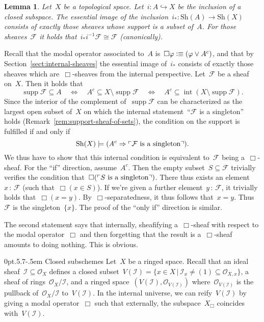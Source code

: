 \documentclass[10pt,reqno,a4paper]{amsbook}
\makeatletter
\theoremstyle{definition}
\theoremstyle{plain}
\newtheorem{lemma}[defn]{Lemma}
\theoremstyle{remark}
\newcommand{\F}{\mathcal{F}}
\renewcommand{\O}{\mathcal{O}}
\newcommand{\I}{\mathcal{I}}
\newcommand{\Sh}{\mathrm{Sh}}
\DeclareMathOperator{\Int}{int}
\DeclareMathOperator{\supp}{supp}
\newcommand{\?}{\,{:}\,}
\renewcommand{\_}{\mathpunct{.}\,}
\newcommand{\speak}[1]{\ulcorner\text{\textnormal{#1}}\urcorner}
\newcommand{\defequiv}{\vcentcolon\equiv}
\renewenvironment{proof}[1][\proofname]{\par
  \pushQED{\qed}%
  \normalfont \topsep6\p@\@plus6\p@\relax
  \trivlist
  \item[\hskip\labelsep
        \itshape
    #1\@addpunct{.}]\ignorespaces
}{%
  \popQED\endtrivlist\@endpefalse
}
\def\subsection{\@startsection{subsection}{2}%
  {0pt}{.5\linespacing\@plus.7\linespacing}{-.5em}%
  {\normalfont\bfseries}}
\makeatother
\begin{document}
\begin{lemma}\label{lemma:essim-closed-immersion}
Let~$X$ be a topological space. Let~$i : A \hookrightarrow X$ be the inclusion
of a closed subspace. The essential image of the
inclusion~$i_* : \Sh(A) \to \Sh(X)$ consists of exactly those sheaves whose support
is a subset of~$A$. For those sheaves~$\F$ it holds that~$i_* i^{-1} \F \cong \F$
(canonically).\end{lemma}
\begin{proof}Recall that the modal operator associated to~$A$ is~$\Box\varphi
\defequiv (\varphi \vee A^c)$, and that by Section~\ref{sect:internal-sheaves} the
essential image of~$i_*$ consists of exactly those sheaves which
are~$\Box$-sheaves from the internal perspective. Let~$\F$ be a sheaf on~$X$.
Then it holds that
\[ \supp\F \subseteq A \quad\Longleftrightarrow\quad
  A^c \subseteq X \setminus \supp\F \quad\Longleftrightarrow\quad
  A^c \subseteq \Int(X \setminus \supp\F). \]
Since the interior of the complement of~$\supp\F$ can be characterized as the
largest open subset of~$X$ on which the internal statement~``$\F$ is a
singleton'' holds (Remark~\ref{rem:support-sheaf-of-sets}), the condition on
the support is fulfilled if and only if
\[ \Sh(X) \models (A^c \Rightarrow \speak{$\F$ is a singleton}). \]
We thus have to show that this internal condition is equivalent to~$\F$ being
a~$\Box$-sheaf. For the ``if'' direction, assume~$A^c$. Then the empty subset~$S
\subseteq \F$ trivially verifies the condition that~$\Box(\speak{$S$ is a
singleton})$. There thus exists an element~$x\?\F$ (such that~$\Box(x \in S)$).
If we're given a further element~$y\?\F$, it trivially holds that~$\Box(x =
y)$. By~$\Box$-separatedness, it thus follows that~$x = y$. Thus~$\F$ is the
singleton~$\{x\}$. The proof of the ``only if'' direction is similar.

The second statement says that internally, sheafifying a~$\Box$-sheaf with
respect to the modal operator~$\Box$ and then forgetting that the result is
a~$\Box$-sheaf amounts to doing nothing. This is obvious.
\end{proof}

\subsection{Closed subschemes} Let~$X$ be a ringed space. Recall
that an ideal sheaf~$\I \subseteq \O_X$ defines a closed subset~$V(\I) = \{ x
\in X \,|\, \I_x \neq (1) \subseteq \O_{X,x} \}$, a sheaf of
rings~$\O_X/\I$, and a ringed space~$(V(\I), \O_{V(\I)})$ where~$\O_{V(\I)}$ is
the pullback of~$\O_X/\I$ to~$V(\I)$. In the internal universe, we can
reify~$V(\I)$ by giving a modal operator~$\Box$ such that externally, the
subspace~$X_\Box$ coincides with~$V(\I)$.
\end{document}
